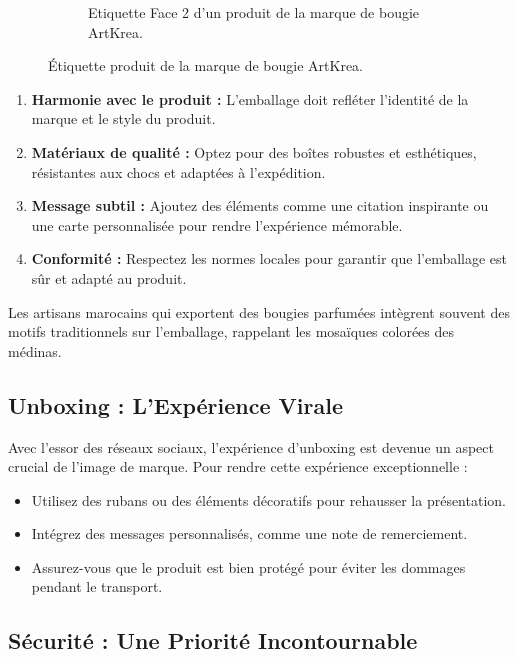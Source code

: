 \documentclass[11pt,fleqn,onecolumn,oneside]{book}
\begin{document}
\begin{figure}[htbp]
\begin{subfigure}[b]{0.45\textwidth}
        \caption{Etiquette Face 2 d'un produit de la marque de bougie ArtKrea.}
        \label{fig:sticker2}
    \end{subfigure}
    \caption{Étiquette produit de la marque de bougie ArtKrea.}
    \label{fig:stickers}
\end{figure}

\begin{enumerate}
    \item \textbf{Harmonie avec le produit :} L’emballage doit refléter l’identité de la marque et le style du produit.
    \item \textbf{Matériaux de qualité :} Optez pour des boîtes robustes et esthétiques, résistantes aux chocs et adaptées à l’expédition.
    \item \textbf{Message subtil :} Ajoutez des éléments comme une citation inspirante ou une carte personnalisée pour rendre l’expérience mémorable.
    \item \textbf{Conformité :} Respectez les normes locales pour garantir que l’emballage est sûr et adapté au produit.
\end{enumerate}

\begin{example}
Les artisans marocains qui exportent des bougies parfumées intègrent souvent des motifs traditionnels sur l’emballage, rappelant les mosaïques colorées des médinas.
\end{example}

\subsection*{Unboxing : L’Expérience Virale}

Avec l’essor des réseaux sociaux, l’expérience d’unboxing est devenue un aspect crucial de l’image de marque. Pour rendre cette expérience exceptionnelle :
\begin{itemize}
    \item Utilisez des rubans ou des éléments décoratifs pour rehausser la présentation.
    \item Intégrez des messages personnalisés, comme une note de remerciement.
    \item Assurez-vous que le produit est bien protégé pour éviter les dommages pendant le transport.
\end{itemize}

\subsection*{Sécurité : Une Priorité Incontournable}
\end{document}
